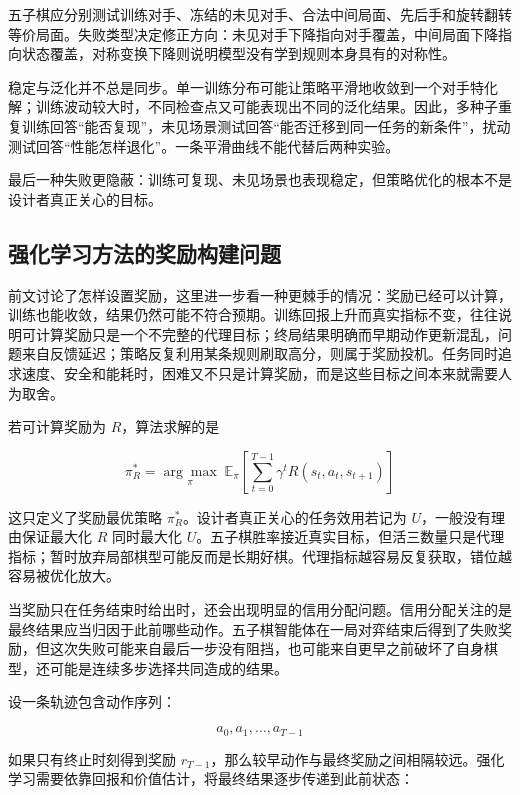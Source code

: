 \documentclass[UTF8,a4paper,zihao=-4,oneside,openany]{ctexbook}
\begin{document}
五子棋应分别测试训练对手、冻结的未见对手、合法中间局面、先后手和旋转翻转等价局面。失败类型决定修正方向：未见对手下降指向对手覆盖，中间局面下降指向状态覆盖，对称变换下降则说明模型没有学到规则本身具有的对称性。

稳定与泛化并不总是同步。单一训练分布可能让策略平滑地收敛到一个对手特化解；训练波动较大时，不同检查点又可能表现出不同的泛化结果。因此，多种子重复训练回答“能否复现”，未见场景测试回答“能否迁移到同一任务的新条件”，扰动测试回答“性能怎样退化”。一条平滑曲线不能代替后两种实验。

最后一种失败更隐蔽：训练可复现、未见场景也表现稳定，但策略优化的根本不是设计者真正关心的目标。

\subsection{强化学习方法的奖励构建问题}

前文讨论了怎样设置奖励，这里进一步看一种更棘手的情况：奖励已经可以计算，训练也能收敛，结果仍然可能不符合预期。训练回报上升而真实指标不变，往往说明可计算奖励只是一个不完整的代理目标；终局结果明确而早期动作更新混乱，问题来自反馈延迟；策略反复利用某条规则刷取高分，则属于奖励投机。任务同时追求速度、安全和能耗时，困难又不只是计算奖励，而是这些目标之间本来就需要人为取舍。

若可计算奖励为 $R$，算法求解的是

\begin{equation}
\pi_R^*
=
\underset{\pi}{\arg\max}
\;
\mathbb{E}_{\pi}
\left[
\sum_{t=0}^{T-1}
\gamma^t R(s_t,a_t,s_{t+1})
\right]
\end{equation}

这只定义了奖励最优策略 $\pi_R^*$。设计者真正关心的任务效用若记为 $U$，一般没有理由保证最大化 $R$ 同时最大化 $U$。五子棋胜率接近真实目标，但活三数量只是代理指标；暂时放弃局部棋型可能反而是长期好棋。代理指标越容易反复获取，错位越容易被优化放大。


当奖励只在任务结束时给出时，还会出现明显的信用分配问题。信用分配关注的是最终结果应当归因于此前哪些动作。五子棋智能体在一局对弈结束后得到了失败奖励，但这次失败可能来自最后一步没有阻挡，也可能来自更早之前破坏了自身棋型，还可能是连续多步选择共同造成的结果。

设一条轨迹包含动作序列：

\begin{equation}
a_0,a_1,\ldots,a_{T-1}
\end{equation}

如果只有终止时刻得到奖励 $r_{T-1}$，那么较早动作与最终奖励之间相隔较远。强化学习需要依靠回报和价值估计，将最终结果逐步传递到此前状态：
\end{document}
